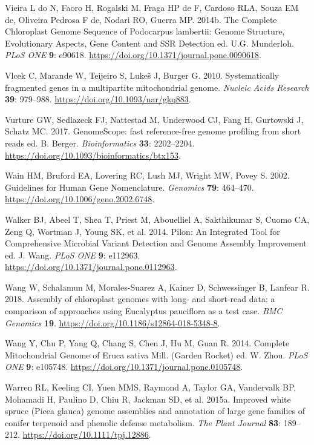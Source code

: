 \documentclass[
  12pt,
  oneside,
  openany]{book}
\begin{document}
\leavevmode\hypertarget{ref-Vieira_2014_Complete}{}%
Vieira L do N, Faoro H, Rogalski M, Fraga HP de F, Cardoso RLA, Souza EM de, Oliveira Pedrosa F de, Nodari RO, Guerra MP. 2014b. The Complete Chloroplast Genome Sequence of Podocarpus lambertii: Genome Structure, Evolutionary Aspects, Gene Content and SSR Detection ed. U.G. Munderloh. \emph{PLoS ONE} \textbf{9}: e90618. \url{https://doi.org/10.1371/journal.pone.0090618}.

\leavevmode\hypertarget{ref-Vlcek_2010}{}%
Vlcek C, Marande W, Teijeiro S, Lukeš J, Burger G. 2010. Systematically fragmented genes in a multipartite mitochondrial genome. \emph{Nucleic Acids Research} \textbf{39}: 979--988. \url{https://doi.org/10.1093/nar/gkq883}.

\leavevmode\hypertarget{ref-Vurture_2017}{}%
Vurture GW, Sedlazeck FJ, Nattestad M, Underwood CJ, Fang H, Gurtowski J, Schatz MC. 2017. GenomeScope: fast reference-free genome profiling from short reads ed. B. Berger. \emph{Bioinformatics} \textbf{33}: 2202--2204. \url{https://doi.org/10.1093/bioinformatics/btx153}.

\leavevmode\hypertarget{ref-Wain_2002}{}%
Wain HM, Bruford EA, Lovering RC, Lush MJ, Wright MW, Povey S. 2002. Guidelines for Human Gene Nomenclature. \emph{Genomics} \textbf{79}: 464--470. \url{https://doi.org/10.1006/geno.2002.6748}.

\leavevmode\hypertarget{ref-Walker_2014}{}%
Walker BJ, Abeel T, Shea T, Priest M, Abouelliel A, Sakthikumar S, Cuomo CA, Zeng Q, Wortman J, Young SK, et al. 2014. Pilon: An Integrated Tool for Comprehensive Microbial Variant Detection and Genome Assembly Improvement ed. J. Wang. \emph{PLoS ONE} \textbf{9}: e112963. \url{https://doi.org/10.1371/journal.pone.0112963}.

\leavevmode\hypertarget{ref-Wang_2018}{}%
Wang W, Schalamun M, Morales-Suarez A, Kainer D, Schwessinger B, Lanfear R. 2018. Assembly of chloroplast genomes with long- and short-read data: a comparison of approaches using Eucalyptus pauciflora as a test case. \emph{BMC Genomics} \textbf{19}. \url{https://doi.org/10.1186/s12864-018-5348-8}.

\leavevmode\hypertarget{ref-Wang_2014}{}%
Wang Y, Chu P, Yang Q, Chang S, Chen J, Hu M, Guan R. 2014. Complete Mitochondrial Genome of Eruca sativa Mill. (Garden Rocket) ed. W. Zhou. \emph{PLoS ONE} \textbf{9}: e105748. \url{https://doi.org/10.1371/journal.pone.0105748}.

\leavevmode\hypertarget{ref-Warren_2015_Improved}{}%
Warren RL, Keeling CI, Yuen MMS, Raymond A, Taylor GA, Vandervalk BP, Mohamadi H, Paulino D, Chiu R, Jackman SD, et al. 2015a. Improved white spruce (Picea glauca) genome assemblies and annotation of large gene families of conifer terpenoid and phenolic defense metabolism. \emph{The Plant Journal} \textbf{83}: 189--212. \url{https://doi.org/10.1111/tpj.12886}.
\end{document}
